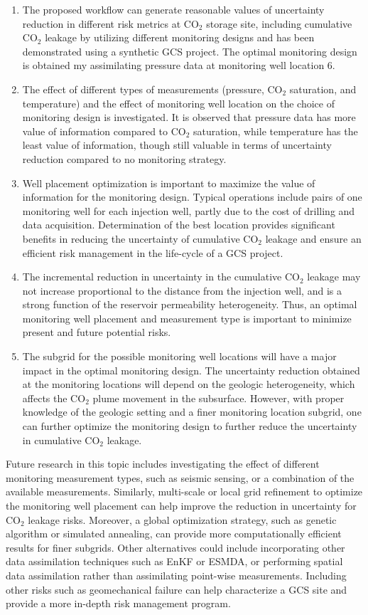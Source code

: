 \documentclass[10pt, twoside]{article}
\begin{document}
\begin{enumerate}
    \item The proposed workflow can generate reasonable values of uncertainty reduction in different risk metrics at CO$_2$ storage site, including cumulative CO$_2$ leakage by utilizing different monitoring designs and has been demonstrated using a synthetic GCS project. The optimal monitoring design is obtained my assimilating pressure data at monitoring well location 6.
    \item The effect of different types of measurements (pressure, CO$_2$ saturation, and temperature) and the effect of monitoring well location on the choice of monitoring design is investigated. It is observed that pressure data has more value of information compared to CO$_2$ saturation, while temperature has the least value of information, though still valuable in terms of uncertainty reduction compared to no monitoring strategy.
    \item Well placement optimization is important to maximize the value of information for the monitoring design. Typical operations include pairs of one monitoring well for each injection well, partly due to the cost of drilling and data acquisition. Determination of the best location provides significant benefits in reducing the uncertainty of cumulative CO$_2$ leakage and ensure an efficient risk management in the life-cycle of a GCS project.
    \item The incremental reduction in uncertainty in the cumulative CO$_2$ leakage may not increase proportional to the distance from the injection well, and is a strong function of the reservoir permeability heterogeneity. Thus, an optimal monitoring well placement and measurement type is important to minimize present and future potential risks.
    \item The subgrid for the possible monitoring well locations will have a major impact in the optimal monitoring design. The uncertainty reduction obtained at the monitoring locations will depend on the geologic heterogeneity, which affects the CO$_2$ plume movement in the subsurface. However, with proper knowledge of the geologic setting and a finer monitoring location subgrid, one can further optimize the monitoring design to further reduce the uncertainty in cumulative CO$_2$ leakage.
\end{enumerate}

Future research in this topic includes investigating the effect of different monitoring measurement types, such as seismic sensing, or a combination of the available measurements. Similarly, multi-scale or local grid refinement to optimize the monitoring well placement can help improve the reduction in uncertainty for CO$_2$ leakage risks. Moreover, a global optimization strategy, such as genetic algorithm or simulated annealing, can provide more computationally efficient results for finer subgrids. Other alternatives could include incorporating other data assimilation techniques such as EnKF or ESMDA, or performing spatial data assimilation rather than assimilating point-wise measurements. Including other risks such as geomechanical failure can help characterize a GCS site and provide a more in-depth risk management program. 
\end{document}
